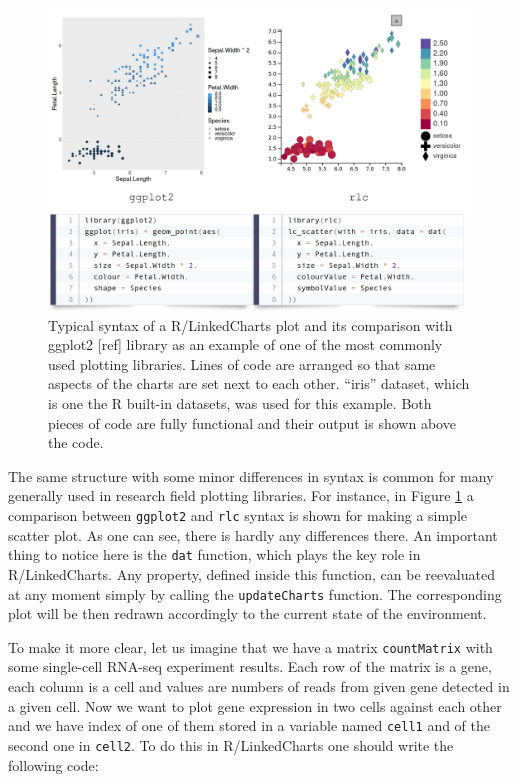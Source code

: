 \documentclass[twocolumn,10pt]{article}
\begin{document}
\begin{figure}
	\includegraphics[width=\textwidth]{FigB/figB.png}
	\caption{Typical syntax of a R/LinkedCharts plot and its comparison with ggplot2 [ref] library as an example of one of the most commonly used plotting libraries. Lines of code are arranged so that same aspects of the charts are set next to each other. ``iris'' dataset, which is one the R built-in datasets, was used for this example. Both pieces of code are fully functional and their output is shown above the code.}
	\label{FigB}
\end{figure}

The same structure with some minor differences in syntax is common for many generally used in research field plotting libraries. For instance, in Figure \ref{FigB} a comparison between \texttt{ggplot2} and \texttt{rlc} syntax is shown for making a simple scatter plot. As one can see, there is hardly any differences there. An important thing to notice here is the \texttt{dat} function, which plays the key role in R/LinkedCharts. Any property, defined inside this function, can be reevaluated at any moment simply by calling the \texttt{updateCharts} function. The corresponding plot will be then redrawn accordingly to the current state of the environment.

To make it more clear, let us imagine that we have a matrix \texttt{countMatrix} with some single-cell RNA-seq experiment results. Each row of the matrix is a gene, each column is a cell and values are numbers of reads from given gene detected in a given cell. Now we want to plot gene expression in two cells against each other and we have index of one of them stored in a variable named \texttt{cell1} and of the second one in \texttt{cell2}. To do this in R/LinkedCharts one should write the following code:
\end{document}
